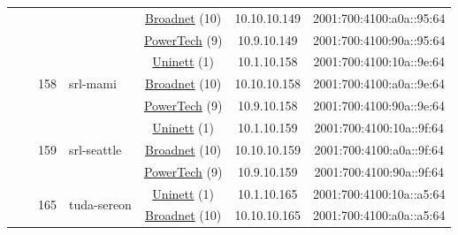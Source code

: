\begin{small}
\begin{center}
\begin{longtable}{|c|c|c|c|c|c|c|c|}
  &  &  &  & \multicolumn{2}{|c|}{\tiny{\href{https://www.broadnet.no}{Broadnet} (10)}} & \tiny{10.10.10.149} & \tiny{2001:700:4100:a0a::95:64} \\* \cline{5-5}\cline{6-6}\cline{7-7}\cline{8-8}
  &  &  &  & \multicolumn{2}{|c|}{\tiny{\href{http://www.powertech.no}{PowerTech} (9)}} & \tiny{10.9.10.149} & \tiny{2001:700:4100:90a::95:64} \\* \cline{3-3}\cline{4-4}\cline{5-5}\cline{6-6}\cline{7-7}\cline{8-8}
  &  & \multirow{3}{*}{\tiny{158}} & \multicolumn{1}{|l|}{\multirow{3}{*}{\tiny{srl-mami}}} & \multicolumn{2}{|c|}{\tiny{\href{https://www.uninett.no}{Uninett} (1)}} & \tiny{10.1.10.158} & \tiny{2001:700:4100:10a::9e:64} \\* \cline{5-5}\cline{6-6}\cline{7-7}\cline{8-8}
  &  &  &  & \multicolumn{2}{|c|}{\tiny{\href{https://www.broadnet.no}{Broadnet} (10)}} & \tiny{10.10.10.158} & \tiny{2001:700:4100:a0a::9e:64} \\* \cline{5-5}\cline{6-6}\cline{7-7}\cline{8-8}
  &  &  &  & \multicolumn{2}{|c|}{\tiny{\href{http://www.powertech.no}{PowerTech} (9)}} & \tiny{10.9.10.158} & \tiny{2001:700:4100:90a::9e:64} \\* \cline{3-3}\cline{4-4}\cline{5-5}\cline{6-6}\cline{7-7}\cline{8-8}
  &  & \multirow{3}{*}{\tiny{159}} & \multicolumn{1}{|l|}{\multirow{3}{*}{\tiny{srl-seattle}}} & \multicolumn{2}{|c|}{\tiny{\href{https://www.uninett.no}{Uninett} (1)}} & \tiny{10.1.10.159} & \tiny{2001:700:4100:10a::9f:64} \\* \cline{5-5}\cline{6-6}\cline{7-7}\cline{8-8}
  &  &  &  & \multicolumn{2}{|c|}{\tiny{\href{https://www.broadnet.no}{Broadnet} (10)}} & \tiny{10.10.10.159} & \tiny{2001:700:4100:a0a::9f:64} \\* \cline{5-5}\cline{6-6}\cline{7-7}\cline{8-8}
  &  &  &  & \multicolumn{2}{|c|}{\tiny{\href{http://www.powertech.no}{PowerTech} (9)}} & \tiny{10.9.10.159} & \tiny{2001:700:4100:90a::9f:64} \\* \cline{3-3}\cline{4-4}\cline{5-5}\cline{6-6}\cline{7-7}\cline{8-8}
  &  & \multirow{3}{*}{\tiny{165}} & \multicolumn{1}{|l|}{\multirow{3}{*}{\tiny{tuda-sereon}}} & \multicolumn{2}{|c|}{\tiny{\href{https://www.uninett.no}{Uninett} (1)}} & \tiny{10.1.10.165} & \tiny{2001:700:4100:10a::a5:64} \\* \cline{5-5}\cline{6-6}\cline{7-7}\cline{8-8}
  &  &  &  & \multicolumn{2}{|c|}{\tiny{\href{https://www.broadnet.no}{Broadnet} (10)}} & \tiny{10.10.10.165} & \tiny{2001:700:4100:a0a::a5:64} \\* \cline{5-5}\cline{6-6}\cline{7-7}\cline{8-8}

\end{longtable}
\end{center}
\end{small}
